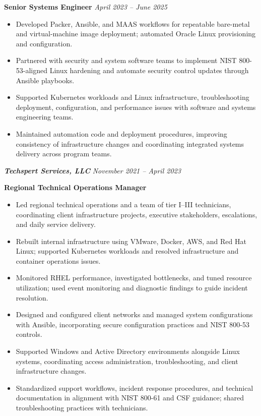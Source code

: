 \documentclass[10.5pt, letterpaper]{article}
\begin{document}
\vspace{8pt}
\textbf{Senior Systems Engineer} \hfill \textit{April 2023 -- June 2025}
\begin{itemize}
  \item Developed Packer, Ansible, and MAAS workflows for repeatable bare-metal and virtual-machine image deployment; automated Oracle Linux provisioning and configuration.
  \item Partnered with security and system software teams to implement NIST 800-53-aligned Linux hardening and automate security control updates through Ansible playbooks.
  \item Supported Kubernetes workloads and Linux infrastructure, troubleshooting deployment, configuration, and performance issues with software and systems engineering teams.
  \item Maintained automation code and deployment procedures, improving consistency of infrastructure changes and coordinating integrated systems delivery across program teams.
\end{itemize}

\vspace{6pt}
\pagebreak
\textbf{\textit{Techspert Services, LLC}} \hfill \textit{November 2021 -- April 2023}

\vspace{1pt}
\textbf{Regional Technical Operations Manager}
\begin{itemize}
  \item Led regional technical operations and a team of tier I--III technicians, coordinating client infrastructure projects, executive stakeholders, escalations, and daily service delivery.
  \item Rebuilt internal infrastructure using VMware, Docker, AWS, and Red Hat Linux; supported Kubernetes workloads and resolved infrastructure and container operations issues.
  \item Monitored RHEL performance, investigated bottlenecks, and tuned resource utilization; used event monitoring and diagnostic findings to guide incident resolution.
  \item Designed and configured client networks and managed system configurations with Ansible, incorporating secure configuration practices and NIST 800-53 controls.
  \item Supported Windows and Active Directory environments alongside Linux systems, coordinating access administration, troubleshooting, and client infrastructure changes.
  \item Standardized support workflows, incident response procedures, and technical documentation in alignment with NIST 800-61 and CSF guidance; shared troubleshooting practices with technicians.
\end{itemize}
\end{document}
